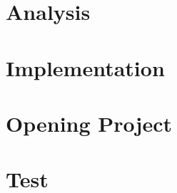 \documentclass[12pt,a4paper]{report}
\begin{document}
    
    
    
    
    \tableofcontents
    
    \chapter{Analysis}
    

    \chapter{Implementation}
    
    
    
    
    
    \chapter{Opening Project}
    
    
    \chapter{Test}
    
    
        
\end{document}
